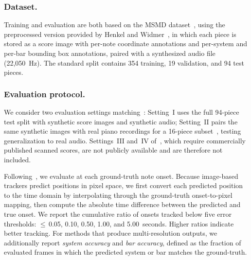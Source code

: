 \documentclass{article}
\begin{document}
\subsubsection{Dataset.}
Training and evaluation are both based on the MSMD dataset~\cite{dorfer2018learning}, using the preprocessed version provided by Henkel and Widmer~\cite{henkel2021real}, in which each piece is stored as a score image with per-note coordinate annotations and per-system and per-bar bounding box annotations, paired with a synthesized audio file (22,050~Hz). The standard split contains 354 training, 19 validation, and 94 test pieces.
 
\subsubsection{Evaluation protocol.}
We consider two evaluation settings matching~\cite{henkel2021real}: 
Setting~I uses the full 94-piece test split with synthetic score images 
and synthetic audio; Setting~II pairs the same synthetic images with real 
piano recordings for a 16-piece subset~\cite{henkel2019score}, testing 
generalization to real audio. Settings~III and~IV of~\cite{henkel2021real}, 
which require commercially published scanned scores, are not publicly 
available and are therefore not included.

Following~\cite{henkel2021real}, we evaluate at each ground-truth note onset.
Because image-based trackers predict positions in pixel space, we first convert each predicted position to the time domain by interpolating through the ground-truth onset-to-pixel mapping, then compute the absolute time difference between the predicted and true onset. We report the cumulative ratio of onsets tracked below five error thresholds: $\leq$\,0.05, 0.10, 0.50, 1.00, and 5.00~seconds. Higher ratios indicate better tracking. For methods that produce multi-resolution outputs, we additionally report \emph{system accuracy} and \emph{bar accuracy}, defined as the fraction of evaluated frames in which the predicted system or bar matches the ground-truth.
 
\end{document}
